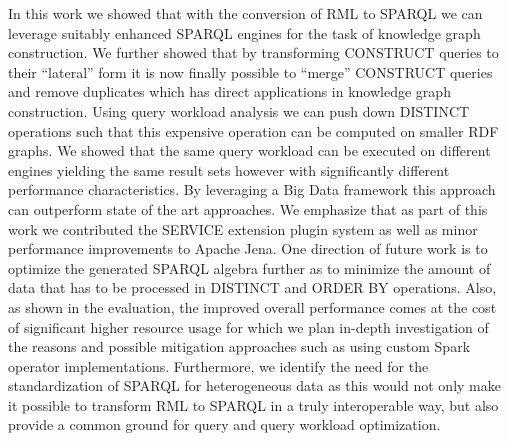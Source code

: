 In this work we showed that with the conversion of RML to SPARQL we can leverage suitably enhanced SPARQL engines for the task of knowledge graph construction.
We further showed that by transforming CONSTRUCT queries to their ``lateral'' form it is now finally possible to ``merge'' CONSTRUCT queries and remove duplicates which has direct applications in knowledge graph construction.
Using query workload analysis we can push down DISTINCT operations such that this expensive operation can be computed on smaller RDF graphs.
We showed that the same query workload can be executed on different engines yielding the same result sets however with significantly different performance characteristics. By leveraging a Big Data framework this approach can outperform state of the art approaches.
We emphasize that as part of this work we contributed the SERVICE extension plugin system as well as minor performance improvements
to Apache Jena.
One direction of future work is to optimize the generated SPARQL algebra further as to minimize the amount of data that has to be processed in DISTINCT and ORDER BY operations. Also, as shown in the evaluation, the improved overall performance comes at the cost of significant higher resource usage for which we plan in-depth investigation of the reasons and possible mitigation approaches such as using custom Spark operator implementations.
Furthermore, we identify the need for the standardization of SPARQL for heterogeneous data as this would not only make it possible to transform RML to SPARQL in a truly interoperable way, but also provide a common ground for query and query workload optimization.

